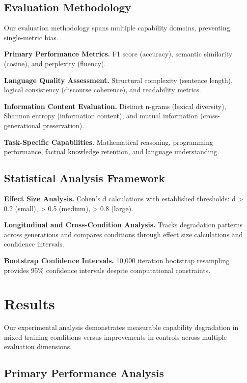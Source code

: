 \documentclass{article}
\begin{document}
\subsection{Evaluation Methodology}

Our evaluation methodology spans multiple capability domains, preventing single-metric bias.

\textbf{Primary Performance Metrics.} F1 score (accuracy), semantic similarity (cosine), and perplexity (fluency).

\textbf{Language Quality Assessment.} Structural complexity (sentence length), logical consistency (discourse coherence), and readability metrics.

\textbf{Information Content Evaluation.} Distinct n-grams (lexical diversity), Shannon entropy (information content), and mutual information (cross-generational preservation).

\textbf{Task-Specific Capabilities.} Mathematical reasoning, programming performance, factual knowledge retention, and language understanding.

\subsection{Statistical Analysis Framework}

\textbf{Effect Size Analysis.} Cohen's d calculations with established thresholds: d > 0.2 (small), > 0.5 (medium), > 0.8 (large).

\textbf{Longitudinal and Cross-Condition Analysis.} Tracks degradation patterns across generations and compares conditions through effect size calculations and confidence intervals.

\textbf{Bootstrap Confidence Intervals.} 10,000 iteration bootstrap resampling provides 95\% confidence intervals despite computational constraints.

\section{Results}

Our experimental analysis demonstrates measurable capability degradation in mixed training conditions versus improvements in controls across multiple evaluation dimensions.

\subsection{Primary Performance Analysis}
\end{document}
